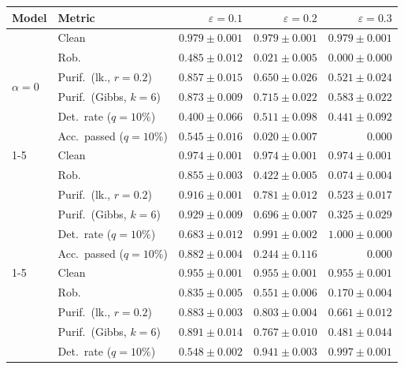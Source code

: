 \begin{table}[htbp]
  \centering
  \small
  \begin{tabular}{@{}llrrr@{}}
    \toprule
    Model & Metric & $\varepsilon=0.1$ & $\varepsilon=0.2$ & $\varepsilon=0.3$ \\
    \midrule
    \multirow{6}{*}{$\alpha{=}0$} & Clean & $\mathbf{0.979 \pm 0.001}$ & $\mathbf{0.979 \pm 0.001}$ & $\mathbf{0.979 \pm 0.001}$ \\
     & Rob. & $0.485 \pm 0.012$ & $0.021 \pm 0.005$ & $0.000 \pm 0.000$ \\
     & Purif.\ (lk., $r{=}0.2$) & $0.857 \pm 0.015$ & $0.650 \pm 0.026$ & $0.521 \pm 0.024$ \\
     & Purif.\ (Gibbs, $k{=}6$) & $0.873 \pm 0.009$ & $0.715 \pm 0.022$ & $0.583 \pm 0.022$ \\
     & Det.\ rate ($q{=}10\%$) & $0.400 \pm 0.066$ & $0.511 \pm 0.098$ & $0.441 \pm 0.092$ \\
     & Acc.\ passed ($q{=}10\%$) & $0.545 \pm 0.016$ & $0.020 \pm 0.007$ & $0.000$ \\
    \cmidrule(lr){1-5}
    \multirow{6}{*}{$\alpha{=}0.001$} & Clean & $0.974 \pm 0.001$ & $0.974 \pm 0.001$ & $0.974 \pm 0.001$ \\
     & Rob. & $0.855 \pm 0.003$ & $0.422 \pm 0.005$ & $0.074 \pm 0.004$ \\
     & Purif.\ (lk., $r{=}0.2$) & $0.916 \pm 0.001$ & $0.781 \pm 0.012$ & $0.523 \pm 0.017$ \\
     & Purif.\ (Gibbs, $k{=}6$) & $0.929 \pm 0.009$ & $0.696 \pm 0.007$ & $0.325 \pm 0.029$ \\
     & Det.\ rate ($q{=}10\%$) & $\mathbf{0.683 \pm 0.012}$ & $\mathbf{0.991 \pm 0.002}$ & $\mathbf{1.000 \pm 0.000}$ \\
     & Acc.\ passed ($q{=}10\%$) & $0.882 \pm 0.004$ & $0.244 \pm 0.116$ & $0.000$ \\
    \cmidrule(lr){1-5}
    \multirow{6}{*}{$\alpha{=}0.01$} & Clean & $0.955 \pm 0.001$ & $0.955 \pm 0.001$ & $0.955 \pm 0.001$ \\
     & Rob. & $0.835 \pm 0.005$ & $0.551 \pm 0.006$ & $0.170 \pm 0.004$ \\
     & Purif.\ (lk., $r{=}0.2$) & $0.883 \pm 0.003$ & $0.803 \pm 0.004$ & $0.661 \pm 0.012$ \\
     & Purif.\ (Gibbs, $k{=}6$) & $0.891 \pm 0.014$ & $0.767 \pm 0.010$ & $0.481 \pm 0.044$ \\
     & Det.\ rate ($q{=}10\%$) & $0.548 \pm 0.002$ & $0.941 \pm 0.003$ & $0.997 \pm 0.001$ \\

\end{tabular}
\end{table}
